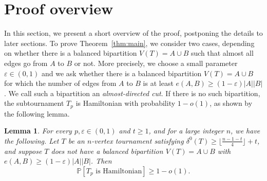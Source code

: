 \documentclass[a4paper,11pt]{article}
\newtheorem{lemma}[theorem]{\bf Lemma}
\theoremstyle{definition}
\newtheorem{example}[theorem]{\bf Example}
\def\eps{\varepsilon}
\def\Pb{\mathbb{P}}
\newcommand{\am}[1]{\textcolor{violet}{am: #1}}
\begin{document}
{%


}


\section{Proof overview}\label{sec:overview}

In this section, we present a short overview of the proof, postponing the details to later sections. To prove Theorem~\ref{thm:main}, we consider two cases, depending on whether there is a balanced bipartition $V(T)=A\cup B$ such that almost all edges go from $A$ to $B$ or not. More precisely, we choose a small parameter $\eps\in (0, 1)$ and we ask whether there is a balanced bipartition $V(T)=A\cup B$ for which the number of edges from $A$ to $B$ is at least $e(A, B)\geq (1-\eps)|A||B|$. We call such a bipartition an \textit{almost-directed cut}. If there is no such bipartition, the subtournament $T_p$ is Hamiltonian with probability $1-o(1)$, as shown by the following lemma.

\begin{lemma}\label{lemma:bidense case}
For every $p, \eps\in (0, 1)$ and $t\geq 1$, and for a large integer $n$, we have the following. Let $T$ be an $n$-vertex tournament satisfying $\delta^0(T)\geq \lfloor \frac{n-1-t}{4}\rfloor+t$, and suppose $T$ does not have a balanced bipartition $V(T)=A\cup B$ with $e(A, B)\geq (1-\eps)|A||B|$. Then
\[\Pb[T_p\text{ is Hamiltonian}]\geq 1-o(1).\]
\end{lemma}
\end{document}
